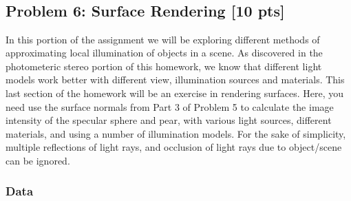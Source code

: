\documentclass[11pt]{article}
\begin{document}
    \begin{center}
    \end{center}
    { \hspace*{\fill} \\}
    
    \begin{center}
    \end{center}
    { \hspace*{\fill} \\}
    
    \begin{center}
    \end{center}
    { \hspace*{\fill} \\}
    
    \begin{center}
    \end{center}
    { \hspace*{\fill} \\}
    
    \hypertarget{problem-6-surface-rendering-10-pts}{%
\subsection{Problem 6: Surface Rendering {[}10
pts{]}}\label{problem-6-surface-rendering-10-pts}}

In this portion of the assignment we will be exploring different methods
of approximating local illumination of objects in a scene. As discovered
in the photometeric stereo portion of this homework, we know that
different light models work better with different view, illumination
sources and materials. This last section of the homework will be an
exercise in rendering surfaces. Here, you need use the surface normals
from Part 3 of Problem 5 to calculate the image intensity of the
specular sphere and pear, with various light sources, different
materials, and using a number of illumination models. For the sake of
simplicity, multiple reflections of light rays, and occlusion of light
rays due to object/scene can be ignored.

\hypertarget{data}{%
\subsubsection{Data}\label{data}}
\end{document}
